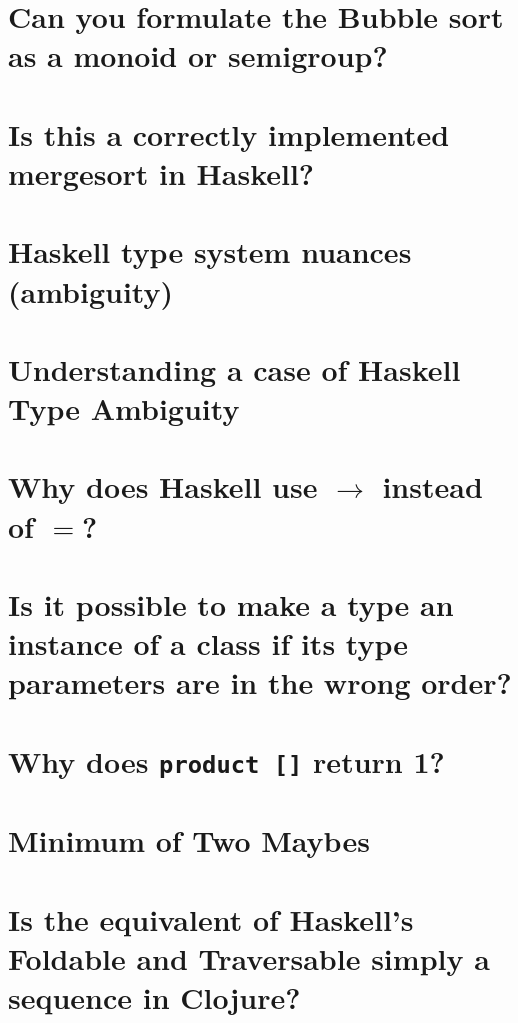 \documentclass{book}
\begin{document}
\section{Can you formulate the Bubble sort as a monoid or semigroup?}


\section{Is this a correctly implemented mergesort in Haskell?}


\section{Haskell type system nuances (ambiguity)}


\section{Understanding a case of Haskell Type Ambiguity}


\section{Why does Haskell use $\to$ instead of $=$?}


\section{Is it possible to make a type an instance of a class if its type parameters are in the wrong order?}


\section{Why does {\tt product []} return 1?}


\section{Minimum of Two Maybes}


\section{Is the equivalent of Haskell's Foldable and Traversable simply a sequence in Clojure?}

\end{document}
